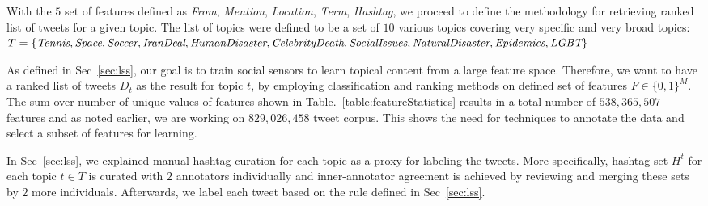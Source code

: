 %
%
With the $5$ set of features defined as \textit{From}, \textit{Mention}, \textit{Location}, \textit{Term}, \textit{Hashtag}, we proceed to define the methodology for retrieving ranked list of tweets for a given topic. The list of topics were defined to be a set of $10$ various topics covering very specific and very broad topics:
$T = \{ \textit{Tennis}, \textit{Space}, \textit{Soccer}, \textit{IranDeal}, \textit{HumanDisaster} \\
, \textit{CelebrityDeath}, \textit{SocialIssues}, \textit{NaturalDisaster}, \textit{Epidemics}, \\
 \textit{LGBT} \}$ 

As defined in Sec~\ref{sec:lss}, our goal is to train social sensors to learn topical content from a large feature space. Therefore, we want to have a ranked list of tweets $D_{t}$ as the result for topic $t$, by employing classification and ranking methods on defined set of features $F \in \{0,1\}^{M}$. The sum over number of unique values of features shown in Table.~\ref{table:featureStatistics} results in a total number of $538,365,507$ features and as noted earlier, we are working on $829,026,458$ tweet corpus. This shows the need for techniques to annotate the data and select a subset of features for learning. 

In Sec~\ref{sec:lss}, we explained manual hashtag curation for each topic as a proxy for labeling the tweets. More specifically, hashtag set $H^{t}$ for each topic $t \in T$ is curated with $2$ annotators individually and inner-annotator agreement is achieved by reviewing and merging these sets by $2$ more individuals. Afterwards, we label each tweet based on the rule defined in Sec~\ref{sec:lss}.%


